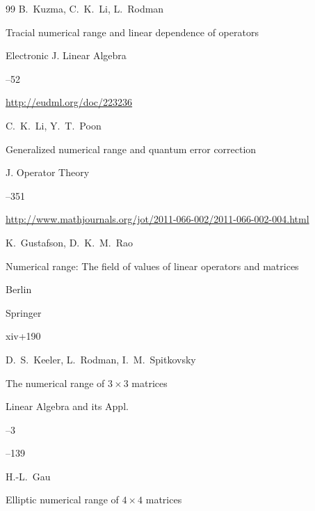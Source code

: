 \begin{thebibliography}{99}
\by B.~Kuzma, C.~K.~Li, L.~Rodman 

\paper Tracial numerical range and linear dependence of operators 

\jour Electronic J. Linear Algebra 



--52

\elink \url{http://eudml.org/doc/223236}




\by C.~K.~Li, Y.~T.~Poon 

\paper Generalized numerical range and quantum error correction 

\jour J. Operator Theory 




--351

\elink \url{http://www.mathjournals.org/jot/2011-066-002/2011-066-002-004.html}




\by K.~Gustafson, D.~K.~M.~Rao 

\book Numerical range: The field of values of linear operators and matrices

\publaddr Berlin 

\publ Springer 


\totalpages xiv+190






\by D.~S.~Keeler, L.~Rodman, I.~M.~Spitkovsky

\paper The numerical range of $3 \times 3$ matrices 

\jour Linear Algebra and its Appl. 



--3 

--139





\by H.-L.~Gau 

\paper Elliptic numerical range of $4 \times 4$ matrices 


\end{thebibliography}
